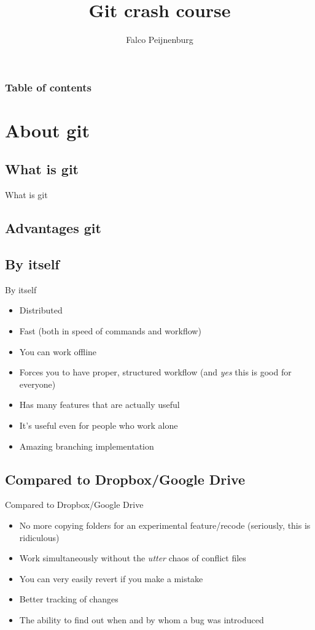 \documentclass[10pt,a4paper]{beamer}
\author{Falco Peijnenburg}
\title[Git crash course\hspace{40mm} \insertframenumber/\inserttotalframenumber]{Git crash course}
\begin{document}
\frame{\titlepage}

\setcounter{tocdepth}{1}
\begin{frame}
\frametitle{Table of contents}
\tableofcontents[]
\end{frame}


\section{About git}
\subsection{What is git}
\begin{frame}{What is git}
\end{frame}

\subsection{Advantages git}

\subsection{By itself}
\begin{frame}{By itself}
\begin{itemize}
\item Distributed
\item Fast (both in speed of commands and workflow)
\item You can work offline
\item Forces you to have proper, structured workflow (and \textit{yes} this is good for everyone)
\item Has many features that are actually useful
\item It's useful even for people who work alone
\item Amazing branching implementation

\end{itemize}
\end{frame}

\subsection{Compared to Dropbox/Google Drive}
\begin{frame}{Compared to Dropbox/Google Drive}
\begin{itemize}
\item No more copying folders for an experimental feature/recode (seriously, this is ridiculous)
\item Work simultaneously without the \textit{utter} chaos of conflict files
\item You can very easily revert if you make a mistake
\item Better tracking of changes
\item The ability to find out when and by whom a bug was introduced
\end{itemize}
\end{frame}
\end{document}
